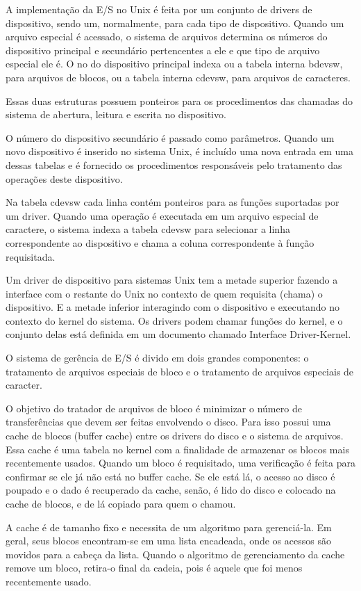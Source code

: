 A implementação da E/S no Unix é feita por um conjunto de drivers de dispositivo, sendo um, normalmente, para cada tipo de dispositivo.
Quando um arquivo especial é acessado, o sistema de arquivos determina os números do dispositivo principal e secundário pertencentes a ele e que tipo de arquivo especial ele é. O no do dispositivo principal indexa ou a tabela interna bdevsw, para arquivos de blocos, ou a tabela interna cdevsw, para arquivos de caracteres.

Essas duas estruturas possuem ponteiros para os procedimentos das chamadas do sistema de abertura, leitura e escrita no dispositivo.

O número do dispositivo secundário é passado como parâmetros. Quando um novo dispositivo é inserido no sistema Unix, é incluído uma nova entrada em uma dessas tabelas e é fornecido os procedimentos responsáveis pelo tratamento das operações deste dispositivo.

Na tabela cdevsw cada linha contém ponteiros para as funções suportadas por um driver. Quando uma operação é executada em um arquivo especial de caractere, o sistema indexa a tabela cdevsw para selecionar a linha correspondente ao dispositivo e chama a coluna correspondente à função requisitada.

Um driver de dispositivo para sistemas Unix tem a metade superior fazendo a interface com o restante do Unix no contexto de quem requisita (chama) o dispositivo. E a metade inferior interagindo com o dispositivo e executando no contexto do kernel do sistema. Os drivers podem chamar funções do kernel, e o conjunto delas está definida em um documento chamado Interface Driver-Kernel.

O sistema de gerência de E/S é divido em dois grandes componentes: o tratamento de arquivos especiais de bloco e o tratamento de arquivos especiais de caracter.

O objetivo do tratador de arquivos de bloco é minimizar o número de transferências que devem ser feitas envolvendo o disco. Para isso possui uma cache de blocos (buffer cache) entre os drivers do disco e o sistema de arquivos. Essa cache é uma tabela no kernel com a finalidade de armazenar os blocos mais recentemente usados. Quando um bloco é requisitado, uma verificação é feita para confirmar se ele já não está no buffer cache. Se ele está lá, o acesso ao disco é poupado e o dado é recuperado da cache, senão, é lido do disco e colocado na cache de blocos, e de lá copiado para quem o chamou.

A cache é de tamanho fixo e necessita de um algoritmo para gerenciá-la. Em geral, seus blocos encontram-se em uma lista encadeada, onde os acessos são movidos para a cabeça da lista. Quando o algoritmo de gerenciamento da cache remove um bloco, retira-o final da cadeia, pois é aquele que foi menos recentemente usado.

